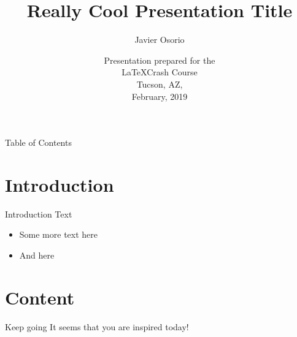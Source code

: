 \documentclass{beamer}
\title[Short Title]{Really Cool Presentation Title}
\author[Osorio]{Javier Osorio}
\institute[UofA]{School of Government and Public Policy \\ 
      University of Arizona}
\date[February, 2019]{Presentation prepared for the \\ 
     \LaTeX Crash Course \\ 
     Tucson, AZ, \\ 
     February, 2019}
\begin{document}
\begin{frame}
   \titlepage
\end{frame}

\begin{frame}{Table of Contents}
   \tableofcontents{}
\end{frame}


\section{Introduction}

\begin{frame}{Introduction}
   Text
   \begin{itemize}
     \item Some more text here
     \item And here
   \end{itemize}
\end{frame}


\section{Content}

\begin{frame}{Keep going}
   It seems that you are inspired today!
\end{frame}

\end{document}
